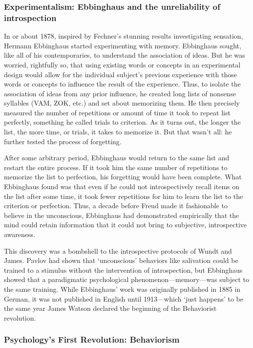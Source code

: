 \subsubsection{Experimentalism: Ebbinghaus and the unreliability of introspection}
\label{experimentalism:ebbinghausandtheunreliabilityofintrospection}

In or about 1878, inspired by Fechner's stunning results investigating sensation, Hermann Ebbinghaus started experimenting with memory. Ebbinghaus sought, like all of his contemporaries, to understand the association of ideas. But he was worried, rightfully so, that using existing words or concepts in an experimental design would allow for the individual subject's previous experience with those words or concepts to influence the result of the experience. Thus, to isolate the association of ideas from any prior influence, he created long lists of nonsense syllables (VAM, ZOK, etc.) and set about memorizing them. He then precisely measured the number of repetitions or amount of time it took to repeat list perfectly, something he called trials to criterion. As it turns out, the longer the list, the more time, or trials, it takes to memorize it. But that wasn't all: he further tested the process of forgetting.

After some arbitrary period, Ebbinghaus would return to the same list and restart the entire process. If it took him the same number of repetitions to memorize the list to perfection, his forgetting would have been complete. What Ebbinghaus found was that even if he could not introspectively recall items on the list after some time, it took fewer repetitions for him to learn the list to the criterion or perfection. Thus, a decade before Freud made it fashionable to believe in the unconscious, Ebbinghaus had demonstrated empirically that the mind could retain information that it could not bring to subjective, introspective awareness.

This discovery was a bombshell to the introspective protocols of Wundt and James. Pavlov had shown that `unconscious' behaviors like salivation could be trained to a stimulus without the intervention of introspection, but Ebbinghaus showed that a paradigmatic psychological phenomenon---memory---was subject to the same training. While Ebbinghaus' work was originally published in 1885 in German, it was not published in English until 1913---which `just happens' to be the same year James Watson declared the beginning of the Behaviorist revolution.

\subsubsection{Psychology's First Revolution: Behaviorism}
\label{psychologysfirstrevolution:behaviorism}

